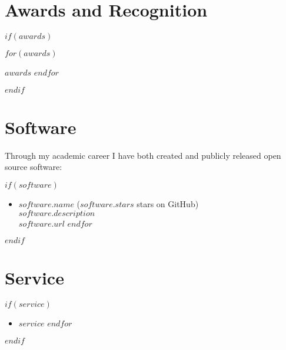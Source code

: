 \documentclass[$fontsize$, a4paper]{article}
\def\labelprefix{}
\begin{document}
\section*{Awards and Recognition}
$if(awards)$
{\def\labelprefix{A}%
\begin{etaremune}
$for(awards)$
\item $awards$
$endfor$
\end{etaremune}
}
$endif$

\section*{Software}
Through my academic career I have both created and publicly released open source software:

$if(software)$
\begin{itemize}
$for(software)$
\item \textit{$software.name$}  ($software.stars$ stars on GitHub)\\$software.description$\\$software.url$
$endfor$
\end{itemize}
$endif$

%

\section*{Service}
$if(service)$
\begin{itemize}
$for(service)$
\item $service$
$endfor$
\end{itemize}
$endif$
\end{document}
